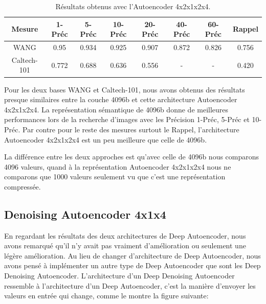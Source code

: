 \begin{table}[H]
\begin{center}
\begin{tabular}{|c|c|c|c|c|c|c|c|}
\hline
	Mesure & 1-Préc & 5-Préc & 10-Préc & 20-Préc & 40-Préc & 60-Préc & Rappel\\
\hline
	WANG & 0.95 & 0.934 & 0.925 & 0.907 & 0.872 & 0.826 & 0.756\\
\hline
	Caltech-101 & 0.772 & 0.688 & 0.636 & 0.556 & - & - & 0.420\\
\hline
\end{tabular}
\end{center}
\caption{Résultats obtenus avec l'Autoencoder 4x2x1x2x4.}
\end{table}

	Pour les deux bases WANG et Caltech-101, nous avons obtenus des résultats presque similaires entre la couche 4096b et cette architecture Autoencoder 4x2x1x2x4. La représentation sémantique de 4096b donne de meilleures performances lors de la recherche d'images avec les Précision 1-Préc, 5-Préc et 10-Préc. Par contre pour le reste des mesures surtout le Rappel, l'architecture Autoencoder 4x2x1x2x4 est un peu meilleure que celle de 4096b.
	
	La différence entre les deux approches est qu'avec celle de 4096b nous comparons 4096 valeurs, quand à la représentation Autoencoder 4x2x1x2x4 nous ne comparons que 1000 valeurs seulement vu que c'est une représentation compressée.




\subsection{Denoising Autoencoder 4x1x4}
	En regardant les résultats des deux architectures de Deep Autoencoder, nous avons remarqué qu'il n'y avait pas vraiment d'amélioration ou seulement une légère amélioration. Au lieu de changer d'architecture de Deep Autoencoder, nous avons pensé à implémenter un autre type de Deep Autoencoder que sont les Deep Denoising Autoencoder. L'architecture d'un Deep Denoising Autoencoder ressemble à l'architecture d'un Deep Autoencoder, c'est la manière d'envoyer les valeurs en entrée qui change, comme le montre la figure suivante:

